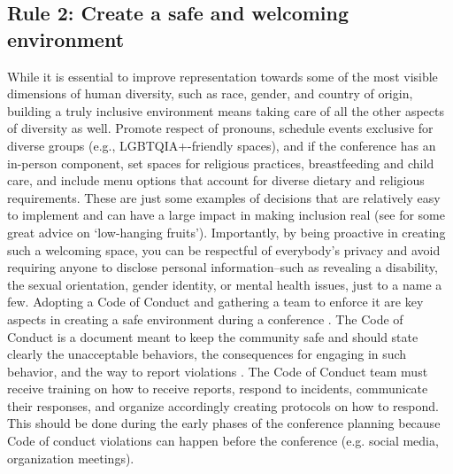 \documentclass[10pt,letterpaper]{article}
\begin{document}


\subsection*{Rule 2: Create a safe and welcoming environment}
\label{rule_inclusion}

While it is essential to improve representation towards some of the most visible dimensions of human diversity, such as race, gender, and country of origin, building a truly inclusive environment means taking care of all the other aspects of diversity as well. 
Promote respect of pronouns, schedule events exclusive for diverse groups (e.g., LGBTQIA+-friendly spaces), and if the conference has an in-person component, set spaces for religious practices, breastfeeding and child care, and include menu options that account for diverse dietary and religious requirements. These are just some examples of decisions that are relatively easy to implement and can have a large impact in making inclusion real (see \cite{noauthor_discover2021} for some great advice on `low-hanging fruits').
Importantly, by being proactive in creating such a welcoming space, you can be respectful of everybody's privacy and avoid requiring anyone to disclose personal information–such as revealing a disability, the sexual orientation, gender identity, or mental health issues, just to a name a few.
Adopting a Code of Conduct and gathering a team to enforce it are key aspects in creating a safe environment during a conference \cite{favaroYourScienceConference2016}.
The Code of Conduct is a document meant to keep the community safe and should state clearly the unacceptable behaviors, the consequences for engaging in such behavior, and the way to report violations \cite{auroraHowRespondCode2019}. 
The Code of Conduct team must receive training on how to receive reports, respond to incidents, communicate their responses, and organize accordingly creating protocols on how to respond. This should be done during the early phases of the conference planning because Code of conduct violations can happen before the conference (e.g. social media, organization meetings).  
\end{document}
